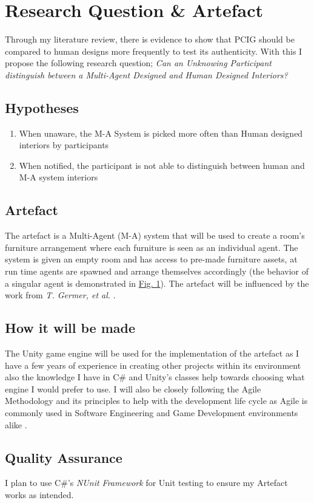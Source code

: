 \section{Research Question \& Artefact}
Through my literature review, there is evidence to show that PCIG should be compared to human designs more frequently to test its authenticity. With this I propose the following research question; \textit{Can an Unknowing Participant distinguish between a Multi-Agent Designed and Human Designed Interiors?}

\subsection{Hypotheses}
\begin{enumerate}
    \item When unaware, the M-A System is picked more often than Human designed interiors by participants
    \item When notified, the participant is not able to distinguish between human and M-A system interiors
\end{enumerate}

\subsection{Artefact}
The artefact is a Multi-Agent (M-A) system that will be used to create a room's furniture arrangement where each furniture is seen as an individual agent. The system is given an empty room and has access to pre-made furniture assets, at run time agents are spawned and arrange themselves accordingly (the behavior of a singular agent is demonstrated in \hyperref[activity-diagram]{Fig. 1}). The artefact will be influenced by the work from \textit{T. Germer, et al.} \cite{real-time-walkthroughs}.

\subsection{How it will be made} 
The Unity game engine\cite{unity} will be used for the implementation of the artefact as I have a few years of experience in creating other projects within its environment also the knowledge I have in C\# and Unity's classes help towards choosing what engine I would prefer to use.
I will also be closely following the Agile Methodology and its principles to help with the development life cycle as Agile is commonly used in Software Engineering and Game Development environments alike \cite{game-dev-agile}.

\subsection{Quality Assurance} 
I plan to use C\#'s \textit{NUnit Framework} \cite{nunit-framework} for Unit testing to ensure my Artefact works as intended.
